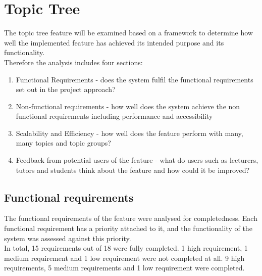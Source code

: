 \section{Topic Tree}

The topic tree feature will be examined based on a framework to determine how well the implemented feature has achieved its intended purpose and its functionality. \\

Therefore the analysis includes four sections:\\
\begin{enumerate}
    \item Functional Requirements - does the system fulfil the functional requirements set out in the project approach?
    \item Non-functional requirements - how well does the system achieve the non functional requirements including performance and accessibility
    \item Scalability and Efficiency - how well does the feature perform with many, many topics and topic groups?
    \item Feedback from potential users of the feature - what do users such as lecturers, tutors and students think about the feature and how could it be improved?
\end{enumerate}

\subsection{Functional requirements}
The functional requirements of the feature were analysed for completedness. Each functional requirement has a priority attached to it, and the functionality of the system was assessed against this priority. \\

In total, 15 requirements out of 18 were fully completed. 1 high requirement, 1 medium requirement and 1 low requirement were not completed at all. 9 high requirements, 5 medium requirements and 1 low requirement were completed. \\

